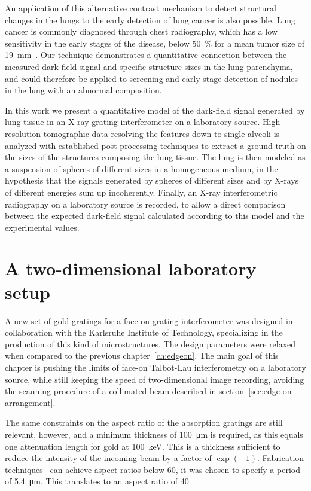 An application of this alternative contrast mechanism to detect 
structural changes in the lungs to the early detection of lung cancer is
also possible. Lung cancer is commonly diagnosed through chest radiography,
which has a low sensitivity in the early stages of the disease, below \SI{50}{\percent} for a mean tumor size of
\SI{19}{\milli\meter}~\parencite{Fardanesh2012,doi:10.1148/radiol.11100153}.
Our technique demonstrates a quantitative connection between the measured
dark-field signal and specific structure sizes in the lung parenchyma, and
could therefore be applied to screening and early-stage detection of nodules in
the lung with an abnormal composition.

In this work we present a quantitative model of the dark-field signal
generated by lung tissue in an X-ray grating interferometer on a laboratory
source. High-resolution tomographic data resolving the features down to single
alveoli is analyzed with established post-processing techniques to extract a
ground truth on the sizes of the structures composing the lung tissue. The
lung is then modeled as a suspension of spheres of different sizes in a
homogeneous medium, in the hypothesis that the signals generated by spheres
of different sizes and by X-rays of different energies sum up incoherently.
Finally, an X-ray interferometric radiography on a laboratory source is
recorded, to allow a direct comparison between the expected dark-field
signal calculated according to this model and the experimental values.

\section{A two-dimensional laboratory setup}
A new set of gold gratings for a face-on grating interferometer was designed
in collaboration with the Karlsruhe Institute of Technology, specializing in
the production of this kind of microstructures. The design parameters were
relaxed when compared to the previous chapter~\ref{ch:edgeon}. The main goal
of this chapter is pushing the limits of face-on Talbot-Lau
interferometry on a laboratory source, while still keeping the speed of
two-dimensional image recording, avoiding the scanning procedure of a
collimated beam described in section~\ref{sec:edge-on-arrangement}.

The same constraints on the aspect ratio of the absorption gratings are
still relevant, however, and a minimum thickness of \SI{100}{\micro\meter}
is required, as this equals one attenuation length for gold at \SI{100}{\kilo\eV}.
This is a thickness sufficient to reduce the intensity of the incoming beam
by a factor of $\exp(-1)$. Fabrication
techniques~\parencite{David2007,Kenntner2010} can achieve aspect ratios below
\num{60}, it was chosen to specify a period of \SI{5.4}{\micro\meter}. This
translates to an aspect ratio of \num{40}.

